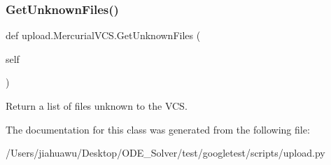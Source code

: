 \subsubsection{\texorpdfstring{Get\+Unknown\+Files()}{GetUnknownFiles()}}
{\footnotesize\ttfamily def upload.\+Mercurial\+V\+C\+S.\+Get\+Unknown\+Files (\begin{DoxyParamCaption}\item[{}]{self }\end{DoxyParamCaption})}

\begin{DoxyVerb}Return a list of files unknown to the VCS.\end{DoxyVerb}
 

The documentation for this class was generated from the following file\+:\begin{DoxyCompactItemize}
\item 
/\+Users/jiahuawu/\+Desktop/\+O\+D\+E\+\_\+\+Solver/test/googletest/scripts/upload.\+py\end{DoxyCompactItemize}
